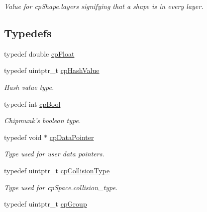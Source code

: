 \begin{DoxyCompactItemize}
\begin{DoxyCompactList}\small\item\em Value for cp\-Shape.\-layers signifying that a shape is in every layer. \end{DoxyCompactList}\end{DoxyCompactItemize}
\subsection*{Typedefs}
\begin{DoxyCompactItemize}
\item 
typedef double \hyperlink{group__basic_types_gac1ed65573e035bf892505768c852d8d3}{cp\-Float}
\item 
\hypertarget{group__basic_types_gae7eb4775a9f43914a15553ca65a048f4}{typedef uintptr\-\_\-t \hyperlink{group__basic_types_gae7eb4775a9f43914a15553ca65a048f4}{cp\-Hash\-Value}}\label{group__basic_types_gae7eb4775a9f43914a15553ca65a048f4}

\begin{DoxyCompactList}\small\item\em Hash value type. \end{DoxyCompactList}\item 
\hypertarget{group__basic_types_gab6e5d8afee598a57cd323abae5310244}{typedef int \hyperlink{group__basic_types_gab6e5d8afee598a57cd323abae5310244}{cp\-Bool}}\label{group__basic_types_gab6e5d8afee598a57cd323abae5310244}

\begin{DoxyCompactList}\small\item\em Chipmunk's boolean type. \end{DoxyCompactList}\item 
\hypertarget{group__basic_types_ga2ac2c3c31e21893941f9e4f8ee279447}{typedef void $\ast$ \hyperlink{group__basic_types_ga2ac2c3c31e21893941f9e4f8ee279447}{cp\-Data\-Pointer}}\label{group__basic_types_ga2ac2c3c31e21893941f9e4f8ee279447}

\begin{DoxyCompactList}\small\item\em Type used for user data pointers. \end{DoxyCompactList}\item 
\hypertarget{group__basic_types_gae83e2f50965eb441e36ffff1e32e6d02}{typedef uintptr\-\_\-t \hyperlink{group__basic_types_gae83e2f50965eb441e36ffff1e32e6d02}{cp\-Collision\-Type}}\label{group__basic_types_gae83e2f50965eb441e36ffff1e32e6d02}

\begin{DoxyCompactList}\small\item\em Type used for cp\-Space.\-collision\-\_\-type. \end{DoxyCompactList}\item 
\hypertarget{group__basic_types_gacd811b1135a8f4a3e5cc019552b18b1a}{typedef uintptr\-\_\-t \hyperlink{group__basic_types_gacd811b1135a8f4a3e5cc019552b18b1a}{cp\-Group}}\label{group__basic_types_gacd811b1135a8f4a3e5cc019552b18b1a}


\end{DoxyCompactItemize}
